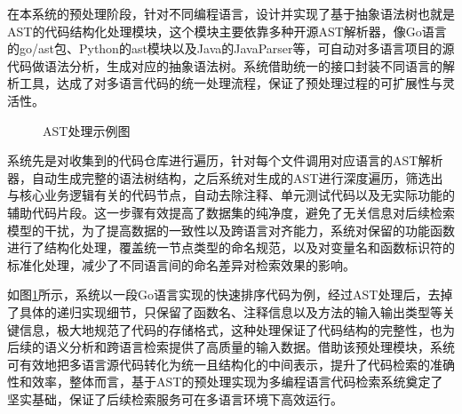 \documentclass[UTF8,a4paper,12pt]{ctexart}
\numberwithin{equation}{section}
\begin{document}
在本系统的预处理阶段，针对不同编程语言，设计并实现了基于抽象语法树也就是AST的代码结构化处理模块，这个模块主要依靠多种开源AST解析器，像Go语言的go/ast包、Python的ast模块以及Java的JavaParser等，可自动对多语言项目的源代码做语法分析，生成对应的抽象语法树。系统借助统一的接口封装不同语言的解析工具，达成了对多语言代码的统一处理流程，保证了预处理过程的可扩展性与灵活性。\par
\begin{figure}[H]
	\caption{AST处理示例图}
	\label{ast_example}
\end{figure}
系统先是对收集到的代码仓库进行遍历，针对每个文件调用对应语言的AST解析器，自动生成完整的语法树结构，之后系统对生成的AST进行深度遍历，筛选出与核心业务逻辑有关的代码节点，自动去除注释、单元测试代码以及无实际功能的辅助代码片段。这一步骤有效提高了数据集的纯净度，避免了无关信息对后续检索模型的干扰，为了提高数据的一致性以及跨语言对齐能力，系统对保留的功能函数进行了结构化处理，覆盖统一节点类型的命名规范，以及对变量名和函数标识符的标准化处理，减少了不同语言间的命名差异对检索效果的影响。\par
如图\ref{ast_example}所示，系统以一段Go语言实现的快速排序代码为例，经过AST处理后，去掉了具体的递归实现细节，只保留了函数名、注释信息以及方法的输入输出类型等关键信息，极大地规范了代码的存储格式，这种处理保证了代码结构的完整性，也为后续的语义分析和跨语言检索提供了高质量的输入数据。借助该预处理模块，系统可有效地把多语言源代码转化为统一且结构化的中间表示，提升了代码检索的准确性和效率，整体而言，基于AST的预处理实现为多编程语言代码检索系统奠定了坚实基础，保证了后续检索服务可在多语言环境下高效运行。\par
\end{document}

